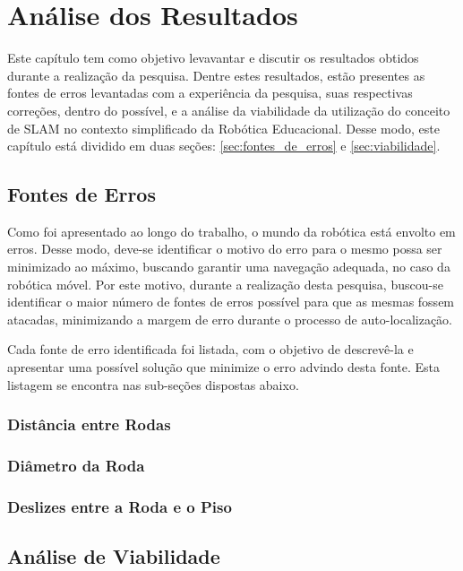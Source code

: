 \chapter[Análise dos Resultados]{Análise dos Resultados}

Este capítulo tem como objetivo levavantar e discutir os resultados obtidos durante a realização da pesquisa. Dentre estes resultados,
estão presentes as fontes de erros levantadas com a experiência da pesquisa, suas respectivas correções, dentro do possível, e a análise da
viabilidade da utilização do conceito de SLAM no contexto simplificado da Robótica Educacional. Desse modo, este capítulo está dividido
em duas seções: \ref{sec:fontes_de_erros} e \ref{sec:viabilidade}.

\section{Fontes de Erros}

Como foi apresentado ao longo do trabalho, o mundo da robótica está envolto em erros. Desse modo, deve-se identificar o motivo do erro
para o mesmo possa ser minimizado ao máximo, buscando garantir uma navegação adequada, no caso da robótica móvel.
Por este motivo, durante a realização desta pesquisa, buscou-se identificar o maior número de fontes de erros possível para que as mesmas fossem
atacadas, minimizando a margem de erro durante o processo de auto-localização.

Cada fonte de erro identificada foi listada, com o objetivo de descrevê-la e apresentar uma possível solução que minimize o erro
advindo desta fonte. Esta listagem se encontra nas sub-seções dispostas abaixo.

\subsection{Distância entre Rodas}

\subsection{Diâmetro da Roda}

\subsection{Deslizes entre a Roda e o Piso}

\section{Análise de Viabilidade}
